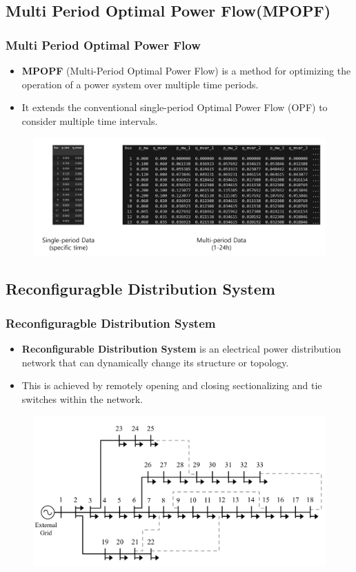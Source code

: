 \documentclass[
	11pt, %
	aspectratio=169, %
]{beamer}
\begin{document}
\subsection{Multi Period Optimal Power Flow(MPOPF)}

\begin{frame}
	\frametitle{Multi Period Optimal Power Flow}

	\begin{itemize}
		\item \textbf{MPOPF} (Multi-Period Optimal Power Flow) is a method for optimizing the operation of a power system over multiple time periods.
		\item It extends the conventional single-period Optimal Power Flow (OPF) to consider multiple time intervals.
	\end{itemize}

	\begin{figure}
		\includegraphics[width=4 in,keepaspectratio]{MPOPFtime.png}
	\end{figure}
	
\end{frame}

\subsection{Reconfiguragble Distribution System}

\begin{frame}
	\frametitle{Reconfiguragble Distribution System}
	
	\begin{itemize}
		\item \textbf{Reconfigurable Distribution System} is an electrical power distribution network that can dynamically change its structure or topology.
		\item This is achieved by remotely opening and closing sectionalizing and tie switches within the network.
	\end{itemize}

	\begin{figure}
		\includegraphics[width=3 in,keepaspectratio]{modified_33_bus.png}
	\end{figure}

\end{frame}
\end{document}

